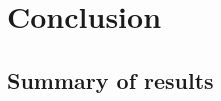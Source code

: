 \documentclass[12pt]{report}
\begin{document}
\chapter{Conclusion}


\section{Summary of results} 
\end{document}
